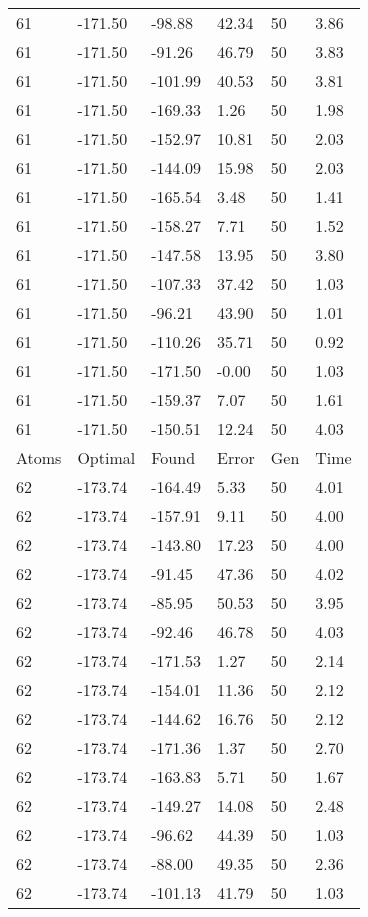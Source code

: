 \documentclass{report}
\begin{document}
\begin{appendix}
\begin{longtable}{llllll}
61 & -171.50 & -98.88 & 42.34 & 50 & 3.86 \\
61 & -171.50 & -91.26 & 46.79 & 50 & 3.83 \\
61 & -171.50 & -101.99 & 40.53 & 50 & 3.81 \\
61 & -171.50 & -169.33 & 1.26 & 50 & 1.98 \\
61 & -171.50 & -152.97 & 10.81 & 50 & 2.03 \\
61 & -171.50 & -144.09 & 15.98 & 50 & 2.03 \\
61 & -171.50 & -165.54 & 3.48 & 50 & 1.41 \\
61 & -171.50 & -158.27 & 7.71 & 50 & 1.52 \\
61 & -171.50 & -147.58 & 13.95 & 50 & 3.80 \\
61 & -171.50 & -107.33 & 37.42 & 50 & 1.03 \\
61 & -171.50 & -96.21 & 43.90 & 50 & 1.01 \\
61 & -171.50 & -110.26 & 35.71 & 50 & 0.92 \\
61 & -171.50 & -171.50 & -0.00 & 50 & 1.03 \\
61 & -171.50 & -159.37 & 7.07 & 50 & 1.61 \\
61 & -171.50 & -150.51 & 12.24 & 50 & 4.03 \\
Atoms & Optimal & Found & Error & Gen & Time \\
62 & -173.74 & -164.49 & 5.33 & 50 & 4.01 \\
62 & -173.74 & -157.91 & 9.11 & 50 & 4.00 \\
62 & -173.74 & -143.80 & 17.23 & 50 & 4.00 \\
62 & -173.74 & -91.45 & 47.36 & 50 & 4.02 \\
62 & -173.74 & -85.95 & 50.53 & 50 & 3.95 \\
62 & -173.74 & -92.46 & 46.78 & 50 & 4.03 \\
62 & -173.74 & -171.53 & 1.27 & 50 & 2.14 \\
62 & -173.74 & -154.01 & 11.36 & 50 & 2.12 \\
62 & -173.74 & -144.62 & 16.76 & 50 & 2.12 \\
62 & -173.74 & -171.36 & 1.37 & 50 & 2.70 \\
62 & -173.74 & -163.83 & 5.71 & 50 & 1.67 \\
62 & -173.74 & -149.27 & 14.08 & 50 & 2.48 \\
62 & -173.74 & -96.62 & 44.39 & 50 & 1.03 \\
62 & -173.74 & -88.00 & 49.35 & 50 & 2.36 \\
62 & -173.74 & -101.13 & 41.79 & 50 & 1.03 \\

\end{longtable}
\end{appendix}
\end{document}
